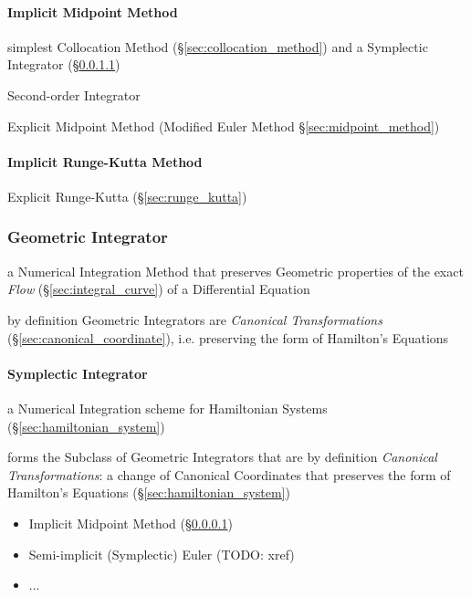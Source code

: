 \paragraph{Implicit Midpoint Method}\label{sec:implicit_midpoint}\hfill

simplest Collocation Method (\S\ref{sec:collocation_method}) and
a Symplectic Integrator (\S\ref{sec:symplectic_integrator})

Second-order Integrator

\fist Explicit Midpoint Method (Modified Euler Method
\S\ref{sec:midpoint_method})



\paragraph{Implicit Runge-Kutta Method}\label{sec:implicit_runge_kutta}\hfill

\fist Explicit Runge-Kutta (\S\ref{sec:runge_kutta})



\subsubsection{Geometric Integrator}\label{sec:geometric_integrator}

a Numerical Integration Method that preserves Geometric properties of the exact
\emph{Flow} (\S\ref{sec:integral_curve}) of a Differential Equation

by definition Geometric Integrators are \emph{Canonical Transformations}
(\S\ref{sec:canonical_coordinate}), i.e. preserving the form of Hamilton's
Equations



\paragraph{Symplectic Integrator}\label{sec:symplectic_integrator}\hfill

a Numerical Integration scheme for Hamiltonian Systems
(\S\ref{sec:hamiltonian_system})

forms the Subclass of Geometric Integrators that are by definition
\emph{Canonical Transformations}: a change of Canonical Coordinates that
preserves the form of Hamilton's Equations (\S\ref{sec:hamiltonian_system})

\begin{itemize}
  \item Implicit Midpoint Method (\S\ref{sec:implicit_midpoint})
  \item Semi-implicit (Symplectic) Euler (TODO: xref)
  \item ...
\end{itemize}



